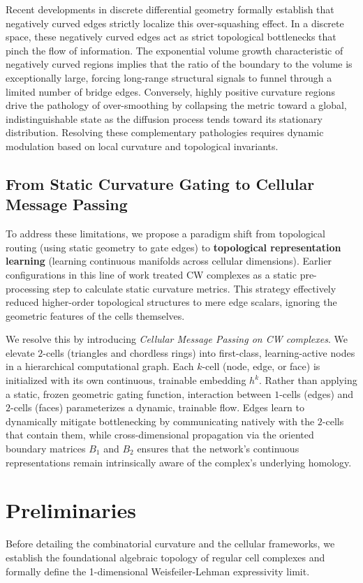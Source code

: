 \documentclass[11pt, letterpaper]{article}
\begin{document}
Recent developments in discrete differential geometry formally establish that negatively curved edges strictly localize this over-squashing effect. In a discrete space, these negatively curved edges act as strict topological bottlenecks that pinch the flow of information. The exponential volume growth characteristic of negatively curved regions implies that the ratio of the boundary to the volume is exceptionally large, forcing long-range structural signals to funnel through a limited number of bridge edges. Conversely, highly positive curvature regions drive the pathology of over-smoothing by collapsing the metric toward a global, indistinguishable state as the diffusion process tends toward its stationary distribution. Resolving these complementary pathologies requires dynamic modulation based on local curvature and topological invariants.

\subsection{From Static Curvature Gating to Cellular Message Passing}
To address these limitations, we propose a paradigm shift from topological routing (using static geometry to gate edges) to \textbf{topological representation learning} (learning continuous manifolds across cellular dimensions). Earlier configurations in this line of work treated CW complexes as a static pre-processing step to calculate static curvature metrics. This strategy effectively reduced higher-order topological structures to mere edge scalars, ignoring the geometric features of the cells themselves.

We resolve this by introducing \emph{Cellular Message Passing on CW complexes}. We elevate $2$-cells (triangles and chordless rings) into first-class, learning-active nodes in a hierarchical computational graph. Each $k$-cell (node, edge, or face) is initialized with its own continuous, trainable embedding $h^k$. Rather than applying a static, frozen geometric gating function, interaction between $1$-cells (edges) and $2$-cells (faces) parameterizes a dynamic, trainable flow. Edges learn to dynamically mitigate bottlenecking by communicating natively with the $2$-cells that contain them, while cross-dimensional propagation via the oriented boundary matrices $B_1$ and $B_2$ ensures that the network's continuous representations remain intrinsically aware of the complex's underlying homology.

\section{Preliminaries}
Before detailing the combinatorial curvature and the cellular frameworks, we establish the foundational algebraic topology of regular cell complexes and formally define the 1-dimensional Weisfeiler-Lehman expressivity limit.
\end{document}

